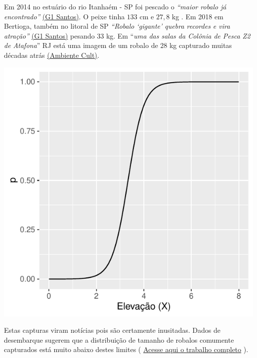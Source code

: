 \documentclass[
]{book}
\begin{document}
Em 2014 no estuário do rio Itanhaém - SP foi pescado o \emph{``maior robalo já encontrado''} \href{http://g1.globo.com/sp/santos-regiao/noticia/2014/11/pescador-fisga-em-itanhaem-o-maior-robalo-ja-encontrado-briguei-com-ele.html}{(G1 Santos)}. O peixe tinha \(133\) cm e \(27,8\) kg . Em 2018 em Bertioga, também no litoral de SP \emph{``Robalo `gigante' quebra recordes e vira atração''} \href{https://g1.globo.com/sp/santos-regiao/noticia/robalo-gigante-quebra-recordes-e-vira-atracao-durante-pescaria-em-sp.ghtml}{(G1 Santos)} pesando \(33\) kg. Em ``\emph{uma das salas da Colônia de Pesca Z2 de Atafona}'' RJ está uma imagem de um robalo de \(28\) kg capturado muitas décadas atrás \href{http://ambientecult.blogspot.com/2010/10/ponto-de-memoria-foto-da-pesca.html}{(Ambiente Cult)}.

\includegraphics[width=20.83in]{probest-cambientais_files/figure-latex/unnamed-chunk-231-1}

Estas capturas viram notícias pois são certamente inusitadas. Dados de desembarque sugerem que a distribuição de tamanho de robalos comumente capturados está muito abaixo destes limites \citep{ximanes-carvalo2006} ( \href{http://repositorio.ufc.br/bitstream/riufc/1312/1/2006_dis_moxcarvalho.pdf}{Acesse aqui o trabalho completo} ).
\end{document}
